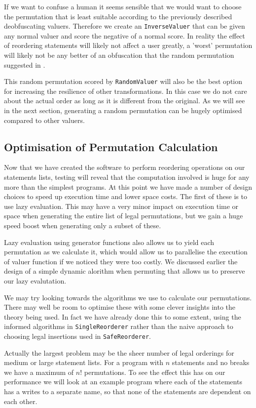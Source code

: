 \documentclass[twoside,a4paper]{report}
\begin{document}
If we want to confuse a human it seems sensible that we would want to choose the permutation that is least suitable according to the previously described
deobfuscating valuers. Therefore we create an \texttt{InverseValuer} that can be given any normal valuer and score the negative of a normal score. In
reality the effect of reordering statements will likely not affect a user greatly, a 'worst' permutation will likely not be any better of an obfuscation
that the random permutation suggested in \cite{taxobftrans}.

This random permutation scored by \texttt{RandomValuer} will also be the best option for increasing the resilience of other transformations. In this case we
do not care about the actual order as long as it is different from the original. As we will see in the next section, generating a random permutation can
be hugely optimised compared to other valuers.

\subsection{Optimisation of Permutation Calculation}

Now that we have created the software to perform reordering operations on our statements lists, testing will reveal that the computation involved is huge
for any more than the simplest programs. At this point we have made a number of design choices to speed up execution time and lower space costs. The first
of these is to use lazy evaluation. This may have a very minor impact on execution time or space when generating the entire list of legal permutations, but
we gain a huge speed boost when generating only a subset of these.

Lazy evaluation using generator functions also allows us to yield each permutation as we calculate it, which would allow us to parallelise the execution of valuer
function if we noticed they were too costly. We discussed earlier the design of a simple dynamic alorithm when permuting that allows us to preserve our lazy
evalutation.

We may try looking towards the algorithms we use to calculate our permutations. There may well be room to optimise these with some clever insights into
the theory being used. In fact we have already done this to some extent, using the informed algorithms in \texttt{SingleReorderer} rather than the naive
approach to choosing legal insertions used in \texttt{SafeReorderer}.

Actually the largest problem may be the sheer number of legal orderings for medium or large statement lists. For a program with $n$ statements and no breaks
we have a maximum of $n!$ permutations. To see the effect this has on our performance we will look at an example program where each of the statements has a
writes to a separate name, so that none of the statements are dependent on each other.
\end{document}
